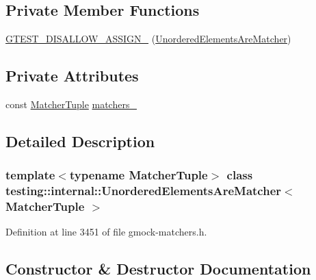 \subsection*{Private Member Functions}
\begin{DoxyCompactItemize}
\item 
\hyperlink{classtesting_1_1internal_1_1UnorderedElementsAreMatcher_a7735afd5dd74513f0dd14da5d2e3bec3}{G\+T\+E\+S\+T\+\_\+\+D\+I\+S\+A\+L\+L\+O\+W\+\_\+\+A\+S\+S\+I\+G\+N\+\_\+} (\hyperlink{classtesting_1_1internal_1_1UnorderedElementsAreMatcher}{Unordered\+Elements\+Are\+Matcher})
\end{DoxyCompactItemize}
\subsection*{Private Attributes}
\begin{DoxyCompactItemize}
\item 
const \hyperlink{structtesting_1_1internal_1_1MatcherTuple}{Matcher\+Tuple} \hyperlink{classtesting_1_1internal_1_1UnorderedElementsAreMatcher_acfcd56f88943d922d7e7ecd8d9c5eb9f}{matchers\+\_\+}
\end{DoxyCompactItemize}


\subsection{Detailed Description}
\subsubsection*{template$<$typename Matcher\+Tuple$>$\newline
class testing\+::internal\+::\+Unordered\+Elements\+Are\+Matcher$<$ Matcher\+Tuple $>$}



Definition at line 3451 of file gmock-\/matchers.\+h.



\subsection{Constructor \& Destructor Documentation}
\mbox{\label{classtesting_1_1internal_1_1UnorderedElementsAreMatcher_ae0a46833600dc8ef768d154ab111f5fa}} 
